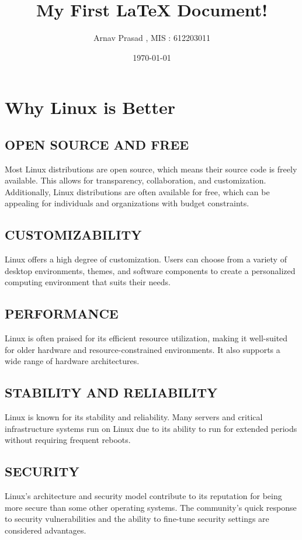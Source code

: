 \documentclass{article}
\begin{document}
\title{My First LaTeX Document!}
\author{Arnav Prasad , MIS : 612203011}
\date{\today}
\maketitle

\newpage

\section{Why Linux is Better}


\subsection{OPEN SOURCE AND FREE}
 Most Linux distributions are open source, which means their source code is freely available. This allows for transparency, collaboration, and customization. Additionally, Linux distributions are often available for free, which can be appealing for individuals and organizations with budget constraints.

\subsection{CUSTOMIZABILITY}
Linux offers a high degree of customization. Users can choose from a variety of desktop environments, themes, and software components to create a personalized computing environment that suits their needs.

\subsection{PERFORMANCE}
Linux is often praised for its efficient resource utilization, making it well-suited for older hardware and resource-constrained environments. It also supports a wide range of hardware architectures.

\subsection{STABILITY AND RELIABILITY}
Linux is known for its stability and reliability. Many servers and critical infrastructure systems run on Linux due to its ability to run for extended periods without requiring frequent reboots.

\subsection{SECURITY}
 Linux's architecture and security model contribute to its reputation for being more secure than some other operating systems. The community's quick response to security vulnerabilities and the ability to fine-tune security settings are considered advantages.
\end{document}
